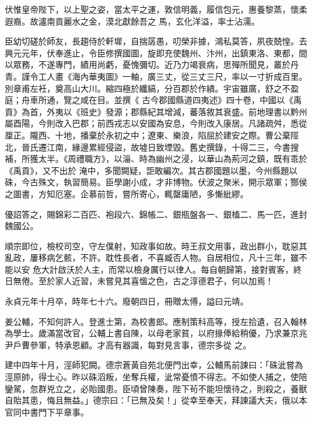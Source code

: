 \begin{pinyinscope}
 伏惟皇帝陛下，以上聖之姿，當太平之運，敦信明義，履信包元，惠養黎蒸，懷柔遐裔。故瀘南貢麗水之金，漠北獻餘吾之
 馬，玄化洋溢，率士沾濡。



 臣幼切磋於師友，長趨侍於軒墀，自揣孱愚，叨榮非據，鴻私莫答，夙夜兢惶。去興元元年，伏奉進止，令臣修撰國圖，旋即充使魏州、汴州，出鎮東洛、東都，間以眾務，不遂專門，績用尚虧，憂愧彌切。近乃力竭衰病，思殫所聞見，叢於丹青。謹令工人畫《海內華夷圖》一軸，廣三丈，從三丈三尺，率以一寸折成百里。別章甫左衽，奠高山大川。縮四極於纖縞，分百郡於作繢。宇宙雖廣，舒之不盈庭；舟車所通，覽之咸在目。並撰《
 古今郡國縣道四夷述》四十卷，中國以《禹貢》為首，外夷以《班史》發源；郡縣紀其增減，蕃落敘其衰盛。前地理書以黔州屬酉陽，今則改入巴郡；前西戎志以安國為安息，今則改入康居。凡諸疏舛，悉從厘正。隴西、十地，播棄於永初之中；遼東、樂浪，陷屈於建安之際。曹公棄陘北，晉氏遷江南，緣邊累經侵盜，故墟日致堙毀。舊史撰錄，十得二三，今書搜補，所獲太半。《周禮職方》，以淄、時為幽州之浸，以華山為荊河之鎮，既有乖於《禹貢》，又不出於
 淹中，多聞闕疑，詎敢編次。其古郡國題以墨，今州縣題以硃，今古殊文，執習簡易。臣學謝小成，才非博物。伏波之聚米，開示眾軍；酂侯之圖書，方知厄塞。企慕前哲，嘗所寄心，輒罄庸陋，多慚紕繆。



 優詔答之，賜錦彩二百匹、袍段六、錦帳二、銀瓶盤各一、銀榼二、馬一匹，進封魏國公。



 順宗即位，檢校司空，守左僕射，知政事如故。時王叔文用事，政出群小，耽惡其亂政，屢移病乞骸，不許。耽性長者，不喜臧否人物。自居相位，凡十三年，雖不能以安
 危大計啟沃於人主，而常以檢身厲行以律人。每自朝歸第，接對賓客，終日無倦。至於家人近習，未嘗見其喜慍之色，古之淳德君子，何以加焉！



 永貞元年十月卒，時年七十六。廢朝四日，冊贈太傅，謚曰元靖。



 姜公輔，不知何許人。登進士第，為校書郎。應制策科高等，授左拾遺，召入翰林為學士。歲滿當改官，公輔上書自陳，以母老家貧，以府掾俸給稍優，乃求兼京兆尹戶曹參軍，特承恩顧。才高有器識，每對見言事，德宗多從
 之。



 建中四年十月，涇師犯闕。德宗蒼黃自苑北便門出幸，公輔馬前諫曰：「硃泚嘗為涇原帥，得士心。昨以硃滔叛，坐奪兵權，泚常憂憤不得志。不如使人捕之，使陪鑾駕，忽群兇立之，必貽國患。臣頃曾陳奏，陛下茍不能坦懷待之，則殺之，養獸自貽其患，悔且無益。」德宗曰：「已無及矣！」從幸至奉天，拜諫議大夫，俄以本官同中書門下平章事。




\end{pinyinscope}
